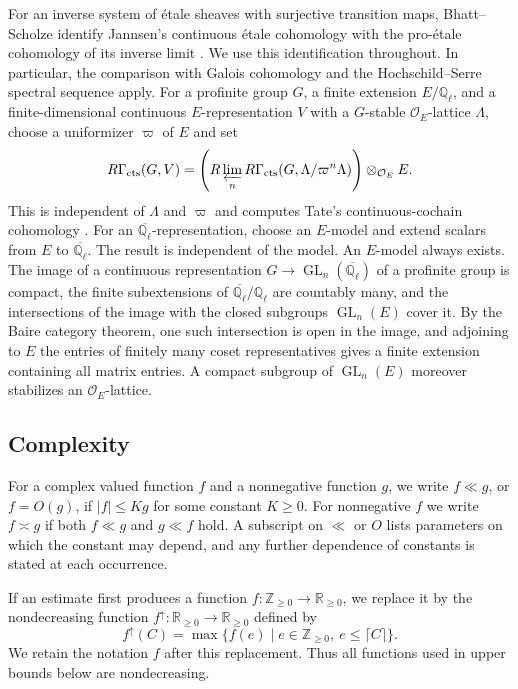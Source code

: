 \documentclass[12pt,reqno]{amsart}
\theoremstyle{definition}
\theoremstyle{plain}
\theoremstyle{definition}
\theoremstyle{remark}
\newcommand{\bbQ}{\mathbb{Q}}  \newcommand{\bbR}{\mathbb{R}}
\newcommand{\ol}[1]{\overline{#1}}
\newcommand{\Ql}{\bbQ_{\ell}}
\begin{document}
For an inverse system of \'etale sheaves with surjective transition maps, Bhatt--Scholze identify
Jannsen's continuous \'etale cohomology with the pro-\'etale cohomology of its inverse limit
\cite[Prop.~5.6.2]{BhattScholze2015}.  We use this identification throughout.  In particular, the
comparison with Galois cohomology and the Hochschild--Serre spectral sequence
\cite[(3.2),(3.3)]{Jannsen88} apply.  For a profinite group \(G\), a finite extension
\(E/\mathbb Q_\ell\), and a finite-dimensional continuous \(E\)-representation \(V\) with a
\(G\)-stable \(\mathcal O_E\)-lattice \(\Lambda\), choose a uniformizer \(\varpi\) of \(E\) and set
\[
 R\Gamma_{\mathrm{cts}}(G,V)
 =\left(R\varprojlim_nR\Gamma_{\mathrm{cts}}(G,\Lambda/\varpi^n\Lambda)\right)
  \otimes_{\mathcal O_E}E.
\]
This is independent of \(\Lambda\) and \(\varpi\) and computes Tate's continuous-cochain cohomology
\cite[(2.1),(2.2)]{Jannsen88}.  For an \(\ol\Ql\)-representation, choose an \(E\)-model and extend
scalars from \(E\) to \(\ol\Ql\).  The result is independent of the model.  An \(E\)-model always
exists.  The image of a continuous representation \(G\to\operatorname{GL}_n(\ol\Ql)\) of a profinite
group is compact, the finite subextensions of \(\ol\Ql/\mathbb Q_\ell\) are countably many, and the
intersections of the image with the closed subgroups \(\operatorname{GL}_n(E)\) cover it.  By the Baire
category theorem, one such intersection is open in the image, and adjoining to \(E\) the entries of
finitely many coset representatives gives a finite extension containing all matrix entries.  A compact
subgroup of \(\operatorname{GL}_n(E)\) moreover stabilizes an \(\mathcal O_E\)-lattice.

\subsection{Complexity}
\label{sec:complexity}

For a complex valued function \(f\) and a nonnegative function \(g\), we write \(f\ll g\), or \(f=O(g)\), if
\(|f|\le Kg\) for some constant \(K\ge0\).  For nonnegative \(f\) we write \(f\asymp g\) if both
\(f\ll g\) and \(g\ll f\) hold.  A subscript on \(\ll\) or \(O\) lists parameters on which the constant
may depend, and any further dependence of constants is stated at each occurrence.


If an estimate first produces a function \(f:\mathbb Z_{\ge0}\to\mathbb R_{\ge0}\), we replace it by the
nondecreasing function \(f^\uparrow:\mathbb R_{\ge0}\to\mathbb R_{\ge0}\) defined by
\[
        f^\uparrow(C)=\max\{f(e)\mid e\in\mathbb Z_{\ge0},\ e\le\lceil C\rceil\}.
\]
We retain the notation \(f\) after this replacement.  Thus all functions used in upper bounds below are
nondecreasing.
\end{document}

